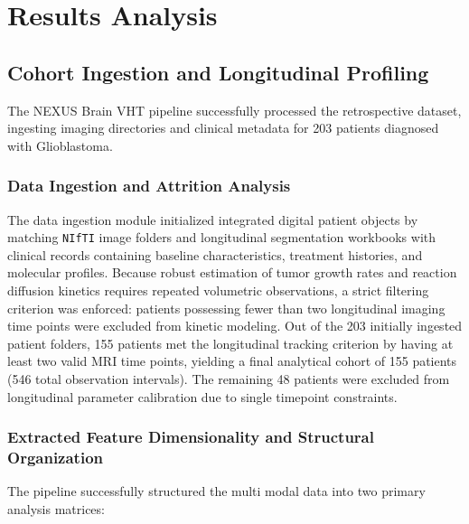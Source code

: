 \section{Results Analysis}

\subsection{Cohort Ingestion and Longitudinal Profiling}

The NEXUS Brain VHT pipeline successfully processed the retrospective dataset, ingesting imaging directories and clinical metadata for 203 patients diagnosed with Glioblastoma. 

\subsubsection{Data Ingestion and Attrition Analysis}

The data ingestion module initialized integrated digital patient objects by matching \texttt{NIfTI} image folders and longitudinal segmentation workbooks with clinical records containing baseline characteristics, treatment histories, and molecular profiles. Because robust estimation of tumor growth rates and reaction diffusion kinetics requires repeated volumetric observations, a strict filtering criterion was enforced: patients possessing fewer than two longitudinal imaging time points were excluded from kinetic modeling. Out of the 203 initially ingested patient folders, 155 patients met the longitudinal tracking criterion by having at least two valid MRI time points, yielding a final analytical cohort of 155 patients (546 total observation intervals). The remaining 48 patients were excluded from longitudinal parameter calibration due to single timepoint constraints.

\subsubsection{Extracted Feature Dimensionality and Structural Organization}

The pipeline successfully structured the multi modal data into two primary analysis matrices:

